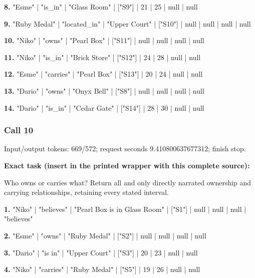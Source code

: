 \noindent\textbf{8.} "Esme" | "is\_in" | "Glass Room" | ["S9"] | 21 | 25 | null | null\par\smallskip

\noindent\textbf{9.} "Ruby Medal" | "located\_in" | "Upper Court" | ["S10"] | null | null | null | null\par\smallskip

\noindent\textbf{10.} "Niko" | "owns" | "Pearl Box" | ["S11"] | null | null | null | null\par\smallskip

\noindent\textbf{11.} "Niko" | "is\_in" | "Brick Store" | ["S12"] | 24 | 28 | null | null\par\smallskip

\noindent\textbf{12.} "Esme" | "carries" | "Pearl Box" | ["S13"] | 20 | 24 | null | null\par\smallskip

\noindent\textbf{13.} "Dario" | "owns" | "Onyx Bell" | ["S8"] | null | null | null | null\par\smallskip

\noindent\textbf{14.} "Dario" | "is\_in" | "Cedar Gate" | ["S14"] | 28 | 30 | null | null\par\smallskip

\subsubsection*{Call 10}

Input/output tokens: 669/572; request seconds 9.410800637677312; finish stop.

\noindent\textbf{Exact task (insert in the printed wrapper with this complete source):}\par Who owns or carries what? Return all and only directly narrated ownership and carrying relationships, retaining every stated interval.

\noindent\textbf{1.} "Niko" | "believes" | "Pearl Box is in Glass Room" | ["S1"] | null | null | null | "believes"\par\smallskip

\noindent\textbf{2.} "Esme" | "owns" | "Ruby Medal" | ["S2"] | null | null | null | null\par\smallskip

\noindent\textbf{3.} "Dario" | "is in" | "Upper Court" | ["S3"] | 20 | 23 | null | null\par\smallskip

\noindent\textbf{4.} "Niko" | "carries" | "Ruby Medal" | ["S5"] | 19 | 26 | null | null\par\smallskip

